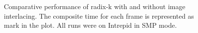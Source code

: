 \documentclass{vgtc}                          %
\begin{document}
\begin{figure}[htbp]
  \centering
  \hfill
  \caption{Comparative performance of radix-k with and without image
    interlacing.  The composite time for each frame is represented as mark
    in the plot.  All runs were on Intrepid in SMP mode.}
  \label{fig:InterlacePerformance}
\end{figure}
\end{document}
